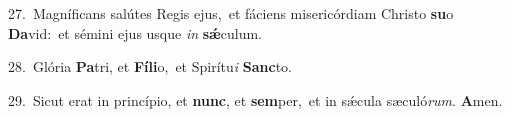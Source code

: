 {\numbfont\textcolor{\numbcolor}{27.}}~Magníficans salútes Regis ejus,~\dagger et fáciens misericórdiam Christo \textbf{su}\-o \textbf{Da}\-vid:~\star et sémini ejus usque \textit{in} \textbf{sǽ}\-culum.\par
{\numbfont\textcolor{\numbcolor}{28.}}~Glória \textbf{Pa}\-tri, et \textbf{Fí}\-\textbf{li}o,~\star et Spirítu\textit{i} \textbf{Sanc}\-to.\par
{\numbfont\textcolor{\numbcolor}{29.}}~Sicut erat in princípio, et \textbf{nunc}\-, et \textbf{sem}\-per,~\star et in sǽcula sæculó\-\textit{rum}\-. \textbf{A}\-men.\par
